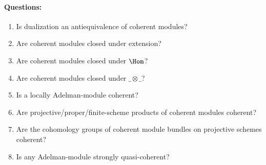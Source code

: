 \paragraph{Questions:}
\begin{enumerate}
\item Is dualization an antiequivalence of coherent modules?
\item Are coherent modules closed under extension?
\item Are coherent modules closed under $\Hom$?
\item Are coherent modules closed under $\_\otimes\_$?
\item \label{coherent-local} Is a locally Adelman-module coherent?
\item Are projective/proper/finite-scheme products of coherent modules coherent?
\item Are the cohomology groups of coherent module bundles on projective schemes coherent?
\item Is any Adelman-module strongly quasi-coherent?
\end{enumerate}

